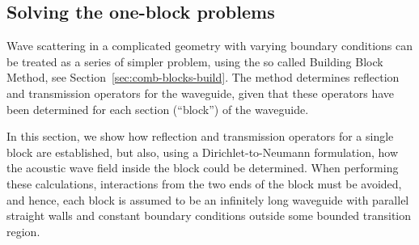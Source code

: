 \documentclass{kluwer}
\renewcommand{\Re}{\operatorname{Re}}
\renewcommand{\i}{\,\mathrm{i}}
\begin{document}
\begin{article}


\section{Solving the one-block problems}
\label{sec:oneblock}

Wave scattering in a complicated geometry with varying boundary
conditions can be treated as a series of simpler problem, using the so
called Building Block Method, see
Section~\ref{sec:comb-blocks-build}. The method determines reflection
and transmission operators for the waveguide, given that these
operators have been determined for each section (``block'') of the
waveguide. 

In this section, we show how reflection and transmission operators for
a single block are established, but also, using a Dirichlet-to-Neumann
formulation, how the acoustic wave field inside the block could be
determined.  When performing these calculations, interactions from the
two ends of the block must be avoided, and hence, each block is
assumed to be an infinitely long waveguide with parallel straight
walls and constant boundary conditions outside some bounded transition
region.


\end{article}
\end{document}
